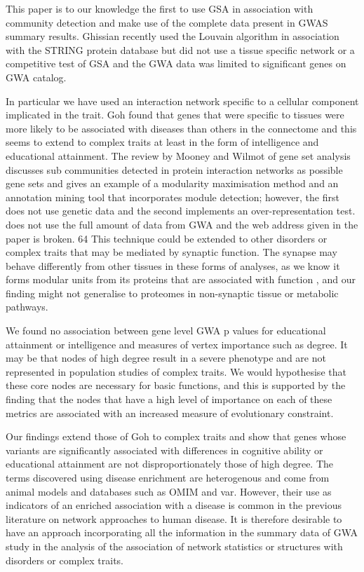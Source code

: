 This paper is to our knowledge the first to use GSA in association with community detection and make use of the complete data present in GWAS summary results. Ghissian recently used the Louvain algorithm in association with the STRING protein database but did not use a tissue specific network or a competitive test of GSA and the GWA data was limited to significant genes on GWA catalog. \cite{ghiassian2015disease} 

In particular we have used an interaction network specific to a cellular component implicated in the trait. Goh found that genes that were specific to tissues were more likely to be associated with diseases than others in the connectome \cite{goh2007human}  and this seems to extend to complex traits at least in the form of intelligence and educational attainment. The review by Mooney and Wilmot of gene set analysis discusses sub communities detected in protein interaction networks as possible gene sets \cite{mooney2015gene}  and gives an example of a modularity maximisation method and an annotation mining tool that incorporates module detection; however, the first does not use genetic data and the second implements an over-representation test. does not use the full amount of data from GWA and the web address given in the paper is broken. 64  This technique could be extended to other disorders or complex traits that may be mediated by synaptic function. The synapse may behave differently from other tissues in these forms of analyses, as we know it forms modular units from its proteins that are associated with function \cite{grant2012synaptopathies} , and our finding might not generalise to proteomes in non-synaptic tissue or metabolic pathways. 

We found no association between gene level GWA p values for educational attainment or intelligence and measures of vertex importance such as degree. It may be that nodes of high degree result in a severe phenotype and are not represented in population studies of complex traits. We would hypothesise that these core nodes are necessary for basic functions, and this is supported by the finding that the nodes that have a high level of importance on each of these metrics are associated with an increased measure of evolutionary constraint. 

 	Our findings extend those of Goh to complex traits and show that genes whose variants are significantly associated with differences in cognitive ability or educational attainment are not disproportionately those of high degree.\cite{goh2007human} 
 The terms discovered using disease enrichment are heterogenous and come from animal models and databases such as OMIM and var. However, their use as indicators of an enriched association with a disease is common in the previous literature on network approaches to human disease. It is therefore desirable to have an approach incorporating all the information in the summary data of GWA study in the analysis of the association of network statistics or structures with disorders or complex traits.
 
